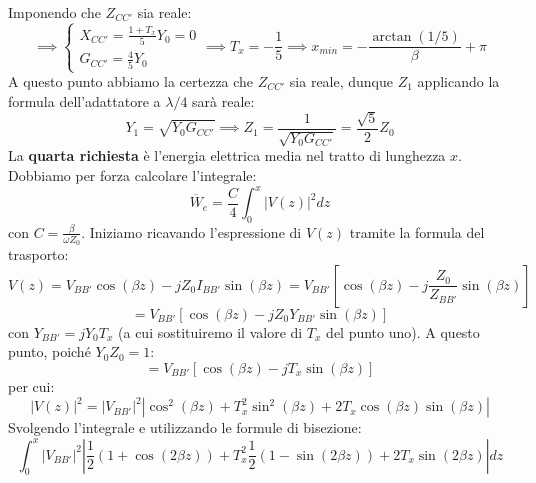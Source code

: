 \documentclass{book}
\begin{document}
        Imponendo che $Z_{CC'}$ sia reale:
        \begin{equation}
            \implies 
            \begin{cases}
                X_{CC'} = \frac{1+T_{x}}{5}Y_{0} = 0 \\
                G_{CC'} = \frac{4}{5}Y_{0}
            \end{cases} \implies T_{x}=-\frac{1}{5} \implies x_{min} =-\frac{\arctan(1/5)}{\beta}+\pi
        \end{equation}
        A questo punto abbiamo la certezza che $Z_{CC'}$ sia reale, dunque $Z_{1}$ applicando la formula dell'adattatore 
        a $\lambda/4$ sarà reale:
        \begin{equation}
            Y_{1} = \sqrt{Y_{0}G_{CC'}} \implies Z_{1} = \frac{1}{\sqrt{Y_{0}G_{CC'}}} = \frac{\sqrt{5}}{2}Z_{0}
        \end{equation}
    La \textbf{quarta richiesta} è l'energia elettrica media nel tratto di lunghezza $x$. Dobbiamo per forza calcolare l'integrale:
    \begin{equation}
        \overline{W}_{e} = \frac{C}{4} \int_{0} ^{x} |V(z)|^{2}dz
    \end{equation}
    con $C=\frac{\beta}{\omega Z_{0}}$. Iniziamo ricavando l'espressione di $V(z)$ tramite la formula del trasporto:
    \begin{equation}
        V(z) = V_{BB'}\cos(\beta z)-jZ_{0}I_{BB'}\sin(\beta z) = V_{BB'}[\cos(\beta z)-j\frac{Z_{0}}{Z_{BB'}}\sin(\beta z)]
    \end{equation}
    \begin{equation}
        =V_{BB'}[\cos(\beta z)-jZ_{0}Y_{BB'}\sin(\beta z)]
    \end{equation}
    con $Y_{BB'}=jY_{0}T_{x}$ (a cui sostituiremo il valore di $T_{x}$ del punto uno). A questo punto, poiché $Y_{0}Z_{0}=1$:
    \begin{equation}
        =V_{BB'}[\cos(\beta z)-jT_{x}\sin(\beta z)]
    \end{equation}
    per cui:
    \begin{equation}
        |V(z)|^{2} = |V_{BB'}|^{2}|\cos^{2}(\beta z)+T_{x} ^{2} \sin ^{2} (\beta z) +2T_{x}\cos(\beta z) \sin(\beta z)|
    \end{equation}
    Svolgendo l'integrale e utilizzando le formule di bisezione:
    \begin{equation}
        \int_{0} ^{x} |V_{BB'}|^{2}|\frac{1}{2}(1+\cos(2\beta z))+T_{x} ^{2} \frac{1}{2}(1-\sin (2\beta z)) +2T_{x}\sin(2\beta z)|dz
    \end{equation}
\end{document}

